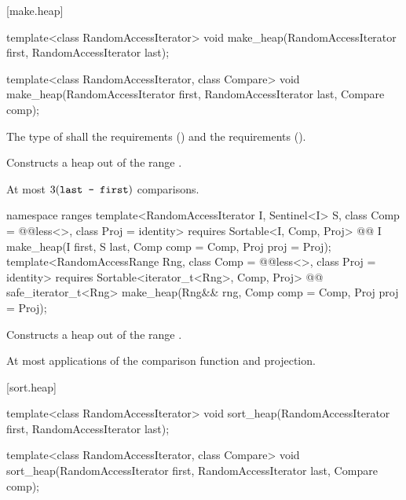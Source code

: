 [make.heap]{}

%
\begin{itemdecl}
template<class RandomAccessIterator>
  void make_heap(RandomAccessIterator first, RandomAccessIterator last);

template<class RandomAccessIterator, class Compare>
  void make_heap(RandomAccessIterator first, RandomAccessIterator last,
                 Compare comp);
\end{itemdecl}

\begin{itemdescr}
\pnum
\requires The type of  shall  
the  requirements
() and the
 requirements
().

\pnum
\effects
Constructs a heap out of the range
.

\pnum
\complexity
At most
$3(\texttt{last - first})$
comparisons.
\end{itemdescr}

\begin{addedblock}
%
\begin{itemdecl}
namespace ranges {
  template<RandomAccessIterator I, Sentinel<I> S, class Comp = @@less<>,
      class Proj = identity>
    requires Sortable<I, Comp, Proj>
    @@ I
      make_heap(I first, S last, Comp comp = Comp{}, Proj proj = Proj{});
  template<RandomAccessRange Rng, class Comp = @@less<>, class Proj = identity>
    requires Sortable<iterator_t<Rng>, Comp, Proj>
    @@ safe_iterator_t<Rng>
      make_heap(Rng&& rng, Comp comp = Comp{}, Proj proj = Proj{});
}
\end{itemdecl}

\begin{itemdescr}
\pnum
\effects
Constructs a heap out of the range
.

\pnum
\returns {}

\pnum
\complexity
At most
applications of the comparison function and projection.
\end{itemdescr}
\end{addedblock}

[sort.heap]{}

%
\begin{itemdecl}
template<class RandomAccessIterator>
  void sort_heap(RandomAccessIterator first, RandomAccessIterator last);

template<class RandomAccessIterator, class Compare>
  void sort_heap(RandomAccessIterator first, RandomAccessIterator last,
                 Compare comp);
\end{itemdecl}

